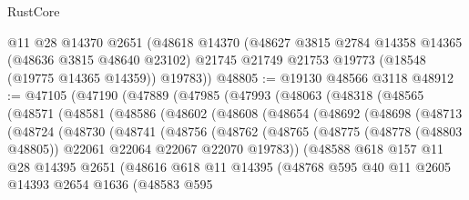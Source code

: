 \begin{lexlean}{RustCore}
\begin{coremodule}
    @11
    @28
    @14370
    @2651
    (@48618
      @14370
      (@48627
        @3815
        @2784
        @14358
        @14365
        (@48636 @3815 @48640 @23102)
        @21745
        @21749
        @21753
        @19773
        (@18548 (@19775 @14365 @14359))
        @19783))
@48805 := @19130 @48566 @3118
@48912 := @47105
    (@47190
      (@47889
        (@47985
          (@47993
            (@48063
              (@48318
                (@48565
                  (@48571
                    (@48581
                      (@48586
                        (@48602
                          (@48608
                            (@48654
                              (@48692
                                (@48698
                                  (@48713
                                    (@48724
                                      (@48730
                                        (@48741
                                          (@48756
                                            (@48762
                                              (@48765
                                                (@48775
                                                  (@48778 (@48803 @48805))
                                                  @22061
                                                  @22064
                                                  @22067
                                                  @22070
                                                  @19783))
                                              (@48588
                                                @618
                                                @157
                                                @11
                                                @28
                                                @14395
                                                @2651
                                                (@48616
                                                  @618
                                                  @11
                                                  @14395
                                                  (@48768
                                                    @595
                                                    @40
                                                    @11
                                                    @2605
                                                    @14393
                                                    @2654
                                                    @1636
                                                    (@48583
                                                      @595

\end{coremodule}
\end{lexlean}
